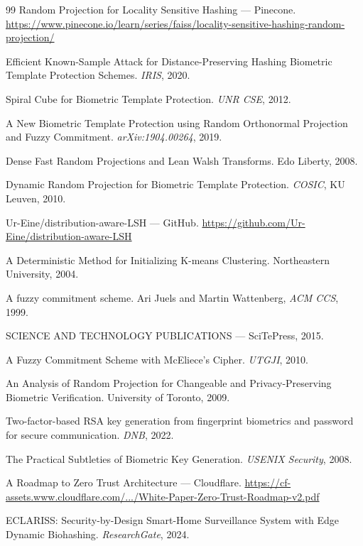 \documentclass[11pt,twoside]{amsart}
\theoremstyle{plain}
\theoremstyle{definition}
\theoremstyle{remark}
\begin{document}
\begin{thebibliography}{99}
Random Projection for Locality Sensitive Hashing --- Pinecone.
\url{https://www.pinecone.io/learn/series/faiss/locality-sensitive-hashing-random-projection/}

Efficient Known-Sample Attack for Distance-Preserving Hashing Biometric Template Protection Schemes.
\textit{IRIS}, 2020.

Spiral Cube for Biometric Template Protection.
\textit{UNR CSE}, 2012.

A New Biometric Template Protection using Random Orthonormal Projection and Fuzzy Commitment.
\textit{arXiv:1904.00264}, 2019.

Dense Fast Random Projections and Lean Walsh Transforms.
Edo Liberty, 2008.

Dynamic Random Projection for Biometric Template Protection.
\textit{COSIC}, KU Leuven, 2010.

Ur-Eine/distribution-aware-LSH --- GitHub.
\url{https://github.com/Ur-Eine/distribution-aware-LSH}

A Deterministic Method for Initializing K-means Clustering.
Northeastern University, 2004.

A fuzzy commitment scheme.
Ari Juels and Martin Wattenberg, \textit{ACM CCS}, 1999.

SCIENCE AND TECHNOLOGY PUBLICATIONS --- SciTePress, 2015.

A Fuzzy Commitment Scheme with McEliece's Cipher.
\textit{UTGJI}, 2010.

An Analysis of Random Projection for Changeable and Privacy-Preserving Biometric Verification.
University of Toronto, 2009.

Two-factor-based RSA key generation from fingerprint biometrics and password for secure communication.
\textit{DNB}, 2022.

The Practical Subtleties of Biometric Key Generation.
\textit{USENIX Security}, 2008.

A Roadmap to Zero Trust Architecture --- Cloudflare.
\url{https://cf-assets.www.cloudflare.com/.../White-Paper-Zero-Trust-Roadmap-v2.pdf}

ECLARISS: Security-by-Design Smart-Home Surveillance System with Edge Dynamic Biohashing.
\textit{ResearchGate}, 2024.


\end{thebibliography}
\end{document}
